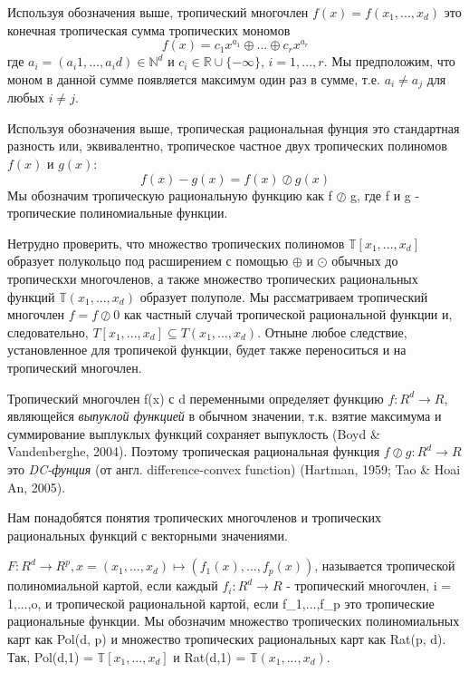 \documentclass[russian]{lecture-notes}
\begin{document}
	\begin{Definition}
		Используя обозначения выше, тропический многочлен $f(x) = f(x_1,...,x_d)$ это конечная тропическая сумма тропических мономов
		\begin{equation*}
		f(x) = {c_1} x^{a_1} \oplus ... \oplus {c_r}x^{a_r}
		\end{equation*}
		где $a_i = (a_i1,...,a_id) \in \mathbb{N}^d$ и $c_i \in \mathbb{R} \cup \{- \infty\}$, $i=1,...,r$. Мы предположим, что моном в данной сумме появляется максимум один раз в сумме, т.е. $a_i \ne a_j$ для любых $i \ne j$. 
	\end{Definition}

	\begin{Definition}
		Используя обозначения выше, тропическая рациональная фунция это стандартная разность или, эквивалентно, тропическое частное двух тропических полиномов $f(x)$ и $g(x)$:
		\begin{equation*}
			f(x) - g(x) = f(x) \oslash g(x)
		\end{equation*}
		Мы обозначим тропическую рациональную функцию как f $\oslash$ g, где f и g - тропические полиномиальные функции.
	\end{Definition}

	Нетрудно проверить, что множество тропических полиномов $\mathbb{T}[x_1,...,x_d]$ образует полукольцо под расширением с помощью $\oplus$ и $\odot$ обычных до тропическхи многочленов, а также множество тропических рациональных функций $\mathbb{T}(x_1,...,x_d)$ образует полуполе. Мы рассматриваем тропический многочлен $f = f \oslash 0$ как частный случай тропической рациональной функции и, следовательно, $T[x_1,...,x_d] \subseteq T(x_1,...,x_d)$. Отныне любое следствие, установленное для тропичекой функции, будет также переноситься и на тропический многочлен.
	
	Тропический многочлен f(x) с d переменными определяет функцию $f: R^d \to R$, являющейся \textit{выпуклой функцией} в обычном значении, т.к. взятие максимума и суммирование выплуклых функций сохраняет выпуклость (Boyd & Vandenberghe, 2004). Поэтому тропическая рациональная функция $f \oslash g : R^d \to R$ это \textit{DC-фунция} (от англ. difference-convex function) (Hartman, 1959; Tao & Hoai An, 2005).
	
	Нам понадобятся понятия тропических многочленов и тропических рациональных функций с векторными значениями.
	
	\begin{Definition}
		$ F : R^d \to R^p, x = (x_1,...,x_d) \mapsto (f_1(x),...,f_p(x))$, называется тропической полиномиальной картой, если каждый $f_i: R^d \to R$ - тропический многочлен, i = 1,...,o, и тропической рациональной картой, если f_1,...,f_p это тропические рациональные функции. Мы обозначим множество тропических полиномиальных карт как Pol(d, p) и множество тропических рациональных карт как Rat(p, d). Так, Pol(d,1) = $\mathbb{T}[x_1,...,x_d]$ и Rat(d,1) = $\mathbb{T}(x_1,...,x_d)$.
	\end{Definition} 
\end{document}
